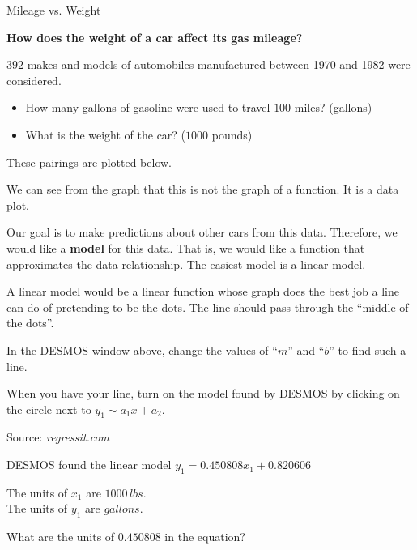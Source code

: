 \documentclass{ximera}
\begin{document}
\begin{model} Mileage vs. Weight

\textbf{How does the weight of a car affect its gas mileage?} 



$392$ makes and models of automobiles manufactured between 1970 and 1982 were considered.  

\begin{itemize}
\item How many gallons of gasoline were used to travel $100$ miles?   (gallons)
\item What is the weight of the car?    ($1000$ pounds)
\end{itemize}


These pairings are plotted below.




\begin{center}
\end{center}


We can see from the graph that this is not the graph of a function.  It is a data plot.


Our goal is to make predictions about other cars from this data.  Therefore, we would like a \textbf{\textcolor{purple!85!blue}{model}} for this data.  That is, we would like a function that approximates the data relationship.  The easiest model is a linear model.


A linear model would be a linear function whose graph does the best job a line can do of pretending to be the dots.  The line should pass through the ``middle of the dots''.

In the DESMOS window above, change the values of ``$m$'' and ``$b$'' to find such a line. 

When you have your line, turn on the model found by DESMOS by clicking on the circle next to $y_1 \sim a_1 x + a_2$.


Source:   \textit{regressit.com}
\end{model}



\begin{question} 



DESMOS found the linear model $y_1 = 0.450808 x_1 + 0.820606$ 


The units of $x_1$ are $1000 \, lbs$. \\
The units of $y_1$ are $gallons$.



What are the units of $0.450808$ in the equation?

\begin{multipleChoice}
\end{multipleChoice}


\end{question}
\end{document}
